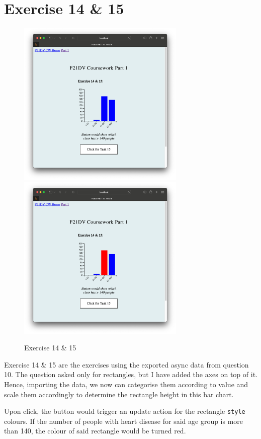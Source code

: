 \documentclass{scrreprt}
\begin{document}
\newpage
\section{Exercise 14 \& 15}
\begin{figure}[!ht]
    \centering
    \includegraphics[width = 8cm]{images/ex14_1.png}
    \includegraphics[width = 8cm]{images/ex14_2.png}
    \label{fig:ex14}
    \caption{Exercise 14 \& 15}
\end{figure}
\FloatBarrier
% 
Exercise 14 \& 15 are the exercises using the exported async data from question 10. The question asked
only for rectangles, but I have added the axes on top of it. Hence, importing the data, we now can
categorise them according to value and scale them accordingly to determine the rectangle height in this
bar chart.\\
\par Upon click, the button would trigger an update action for the rectangle \verb|style| colours. If
the number of people with heart disease for said age group is more than 140, the colour of said rectangle
would be turned red.
\end{document}

